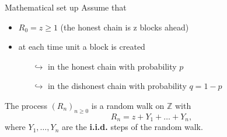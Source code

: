\documentclass{beamer}
\begin{document}
\begin{frame}{Mathematical set up}
\footnotesize
Assume that
\begin{itemize}
\item $R_0=z\geq1$ (the honest chain is z blocks ahead)
\item at each time unit a block is created
\begin{itemize}
  \footnotesize
\item[$\hookrightarrow$] in the honest chain with probability $p$
\item[$\hookrightarrow$] in the dishonest chain with probability $q=1-p$
\end{itemize}
\end{itemize}
The process $(R_n)_{n\geq0}$ is a random walk on $\mathbb{Z}$ with
$$R_n=z+Y_1+\ldots+Y_n,$$
where $Y_1,\ldots,Y_n$ are the \textbf{i.i.d.} steps of the random walk. 

\end{frame}
\end{document}
